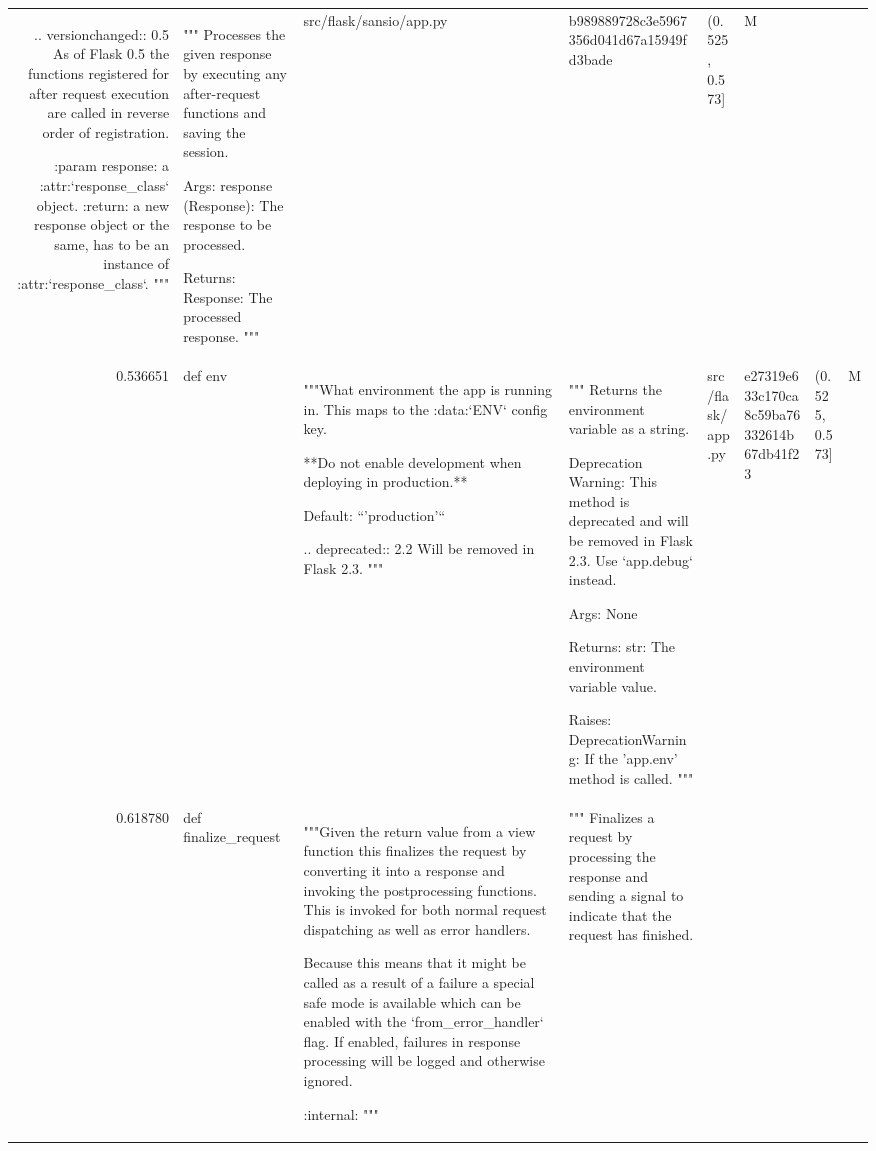 \begin{tabular}{rlllllll}
        .. versionchanged:: 0.5
           As of Flask 0.5 the functions registered for after request
           execution are called in reverse order of registration.

        :param response: a :attr:`response_class` object.
        :return: a new response object or the same, has to be an
                 instance of :attr:`response_class`.
        """ & """
Processes the given response by executing any after-request functions and saving the session.

Args:
    response (Response): The response to be processed.

Returns:
    Response: The processed response.
""" & src/flask/sansio/app.py & b989889728c3e5967356d041d67a15949fd3bade & (0.525, 0.573] & M \\
0.536651 & def env & """What environment the app is running in. This maps to the :data:`ENV` config
        key.

        **Do not enable development when deploying in production.**

        Default: ``'production'``

        .. deprecated:: 2.2
            Will be removed in Flask 2.3.
        """ & """
Returns the environment variable as a string.

Deprecation Warning: This method is deprecated and will be removed in Flask 2.3.
Use `app.debug` instead.

Args:
    None

Returns:
    str: The environment variable value.

Raises:
    DeprecationWarning: If the 'app.env' method is called.
""" & src/flask/app.py & e27319e633c170ca8c59ba76332614b67db41f23 & (0.525, 0.573] & M \\
0.618780 & def finalize_request & """Given the return value from a view function this finalizes
        the request by converting it into a response and invoking the
        postprocessing functions.  This is invoked for both normal
        request dispatching as well as error handlers.

        Because this means that it might be called as a result of a
        failure a special safe mode is available which can be enabled
        with the `from_error_handler` flag.  If enabled, failures in
        response processing will be logged and otherwise ignored.

        :internal:
        """ & """
Finalizes a request by processing the response and sending a signal to indicate that the request has finished.


\end{tabular}
